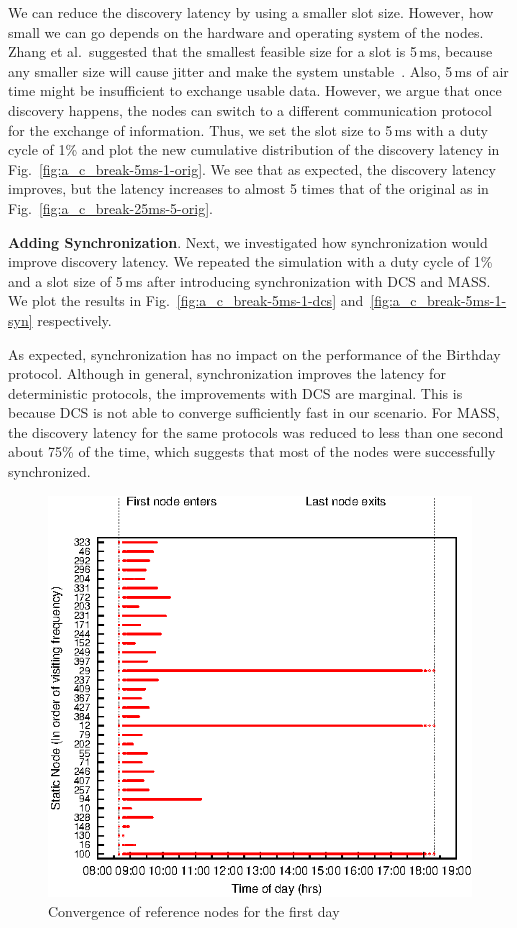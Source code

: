 \documentclass[twoside,twocolumn]{article}
\begin{document}
We can reduce the discovery latency by using a smaller slot size.
However, how small we can go depends on the hardware and operating
system of the nodes.  Zhang et al.\ suggested that the smallest
feasible size for a slot is 5\,ms, because any smaller size will cause
jitter and make the system unstable~\citep{zhang2012acc}. Also, 5\,ms
of air time might be insufficient to exchange usable data. However, we
argue that once discovery happens, the nodes can switch to a different
communication protocol for the exchange of information.  Thus, we set
the slot size to 5\,ms with a duty cycle of 1\% and plot the new
cumulative distribution of the discovery latency in
Fig.~\ref{fig:a_c_break-5ms-1-orig}. We see that as expected, the
discovery latency improves, but the latency increases to almost 5
times that of the original as in Fig.~\ref{fig:a_c_break-25ms-5-orig}.

{\bf Adding Synchronization}. Next, we investigated how
synchronization would improve discovery latency. We repeated the
simulation with a duty cycle of 1\% and a slot size of 5\,ms after
introducing synchronization with DCS and MASS. We plot the results in
Fig.~\ref{fig:a_c_break-5ms-1-dcs}
and~\ref{fig:a_c_break-5ms-1-syn} respectively.

As expected, synchronization has no impact on the performance of the
Birthday protocol. Although in general, synchronization improves the
latency for deterministic protocols, the improvements with DCS are
marginal. This is because DCS is not able to converge sufficiently
fast in our scenario. For MASS, the discovery latency for the same
protocols was reduced to less than one second about 75\% of the time,
which suggests that most of the nodes were successfully
synchronized. 

\begin{figure}[t]
   \centering
   \includegraphics[scale=0.9]{graphs/reference_selection/515}
   \caption{Convergence of reference nodes for the first day} 
   \label{fig:converge-515}
\end{figure}
\end{document}
